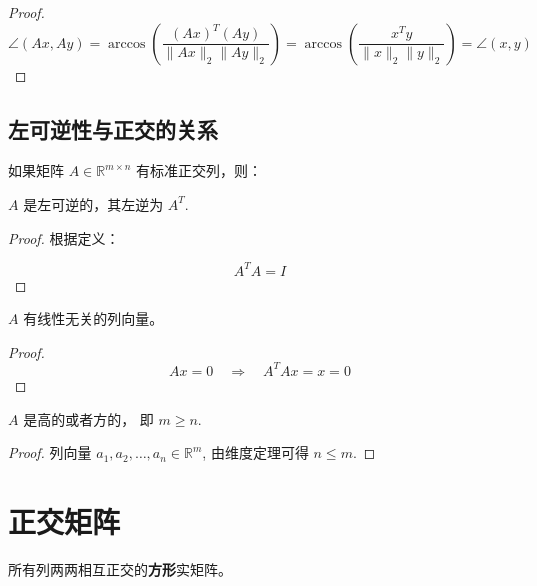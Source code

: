 \begin{proof}
    \begin{equation} \angle(A x, A y)=\arccos \left(\frac{(A x)^{T}(A y)}{\|A x\|_{2}\|A y\|_{2}}\right)=\arccos \left(\frac{x^{T} y}{\|x\|_{2}\|y\|_{2}}\right)=\angle(x, y) \end{equation}
\end{proof}

\subsection{左可逆性与正交的关系}


如果矩阵 $ A \in \mathbb{R}^{m \times n} $ 有标准正交列，则：

\begin{theorem}
    $ A $ 是左可逆的，其左逆为 $ A^{T} $.
\end{theorem}

\begin{proof}
    根据定义：

\begin{equation}
A^{T} A=I
\end{equation}
\end{proof}

\begin{theorem}
    $ A $ 有线性无关的列向量。
\end{theorem}

\begin{proof}
    \begin{equation}
A x=0 \quad \Rightarrow \quad A^{T} A x=x=0
\end{equation}
\end{proof}

\begin{theorem}
    $A$ 是高的或者方的， 即 $m \geq n$.
\end{theorem}

\begin{proof}
    列向量 $ a_{1}, a_{2}, \ldots, a_{n} \in \mathbb{R}^{m} $, 由维度定理可得 $ n \leq m $.
\end{proof}

\section{正交矩阵}

\begin{definition}[正交矩阵]
    所有列两两相互正交的\textbf{方形}实矩阵。
\end{definition}

